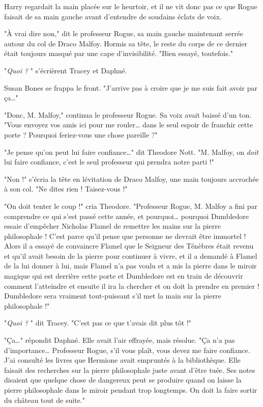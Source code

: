 Harry regardait la main placée sur le heurtoir, et il ne vit donc pas ce que Rogue faisait de sa main gauche avant d'entendre de soudains éclats de voix.

"À vrai dire non," dit le professeur Rogue, sa main gauche maintenant serrée autour du col de Draco Malfoy. Hormis sa tête, le reste du corps de ce dernier était toujours masqué par une cape d'invisibilité. "Bien essayé, toutefois."

"\emph{Quoi ?} " s'écrièrent Tracey et Daphné.

Susan Bones se frappa le front. "J'arrive pas à croire que je me suis fait avoir par ça…"

"Donc, M. Malfoy," continua le professeur Rogue. Sa voix avait baissé d'un ton. "Vous envoyez vos amis ici pour me rouler… dans le seul espoir de franchir cette porte ? Pourquoi feriez-vous une chose pareille ?"

"Je pense qu'on peut lui faire confiance…" dit Theodore Nott. "M. Malfoy, on \emph{doit}  lui faire confiance, c'est le seul professeur qui prendra notre parti !"

"Non !" s'écria la tête en lévitation de Draco Malfoy, une main toujours accrochée à son col. "Ne dites rien ! Taisez-vous !"

"On doit tenter le coup !" cria Theodore. "Professeur Rogue, M. Malfoy a fini par comprendre ce qui s'est passé cette année, et pourquoi… pourquoi Dumbledore essaie d'empêcher Nicholas Flamel de remettre les mains sur la pierre philosophale ! C'est parce qu'il pense que personne ne devrait être immortel ! Alors il a essayé de convaincre Flamel que le Seigneur des Ténèbres était revenu et qu'il avait besoin de la pierre pour continuer à vivre, et il a demandé à Flamel de la lui donner à lui, mais Flamel n'a pas voulu et a mis la pierre dans le miroir magique qui est derrière cette porte et Dumbledore est en train de découvrir comment l'atteindre et ensuite il ira la chercher et on doit la prendre en premier ! Dumbledore sera vraiment tout-puissant s'il met la main sur la pierre philosophale !"

"\emph{Quoi ?} " dit Tracey. "C'est pas ce que t'avais dit plus tôt !"

"Ça…" répondit Daphné. Elle avait l'air effrayée, mais résolue. "Ça n'a pas d'importance… Professeur Rogue, s'il vous plaît, vous devez me faire confiance. J'ai consulté les livres que Hermione avait empruntés à la bibliothèque. Elle faisait des recherches sur la pierre philosophale juste avant d'être tuée. Ses notes disaient que quelque chose de dangereux peut se produire quand on laisse la pierre philosophale dans le miroir pendant trop longtemps. On doit la faire sortir du château tout de suite."

